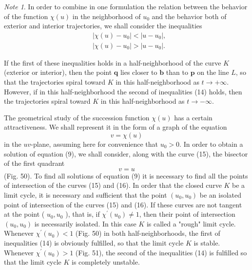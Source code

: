 \documentclass[10pt,a5paper]{book}
\theoremstyle{plain}
\theoremstyle{definition}
\theoremstyle{remark}
\newtheorem*{note}{Note}
\begin{document}
\begin{note}
In order to combine in one formulation the relation between the behavior of the function $\chi(u)$ in the neighborhood of $u_{0}$ and the behavior both of exterior and interior trajectories, we shall consider the inequalities
\begin{align*}
& \left|\chi(u)-u_{0}\right|<\left|u-u_{0}\right|,  \tag{14}\\
& \left|\chi(u)-u_{0}\right|>\left|u-u_{0}\right| .
\end{align*}
\end{note}

If the first of these inequalities holds in a half-neighborhood of the curve $K$ (exterior or interior), then the point $\mathbf{q}$ lies closer to $\mathbf{b}$ than to $\mathbf{p}$ on the line $L$, so that the trajectories spiral toward $K$ in this half-neighborhood as $t \rightarrow+\infty$. However, if in this half-neighborhood the second of inequalities (14) holds, then the trajectories spiral toward $K$ in this half-neighborhood as $t \rightarrow-\infty$.

The geometrical study of the succession function $\chi(u)$ has a certain attractiveness. We shall represent it in the form of a graph of the equation
\begin{equation*}
v=\chi(u) \tag{15}
\end{equation*}
in the $u v$-plane, assuming here for convenience that $u_{0}>0$. In order to obtain a solution of equation (9), we shall consider, along with the curve (15), the bisector of the first quadrant
\begin{equation*}
v=u \tag{16}
\end{equation*}
(Fig. 50). To find all solutions of equation (9) it is necessary to find all the points of intersection of the curves (15) and (16). In order that the closed curve $K$ be a limit cycle, it is necessary and sufficient that the point $\left(u_{0}, u_{0}\right)$ be an isolated point of intersection of the curves (15) and (16). If these curves are not tangent at the point ( $u_{0}, u_{0}$ ), that is, if $\chi^{\prime}\left(u_{0}\right) \neq 1$, then their point of intersection $\left(u_{0}, u_{0}\right)$ is necessarily isolated. In this case $K$ is called a "rough" limit cycle. Whenever $\chi^{\prime}\left(u_{0}\right)<1$ (Fig. 50) in both half-neighborhoods, the first of inequalities (14) is obviously fulfilled, so that the limit cycle $K$ is stable. Whenever $\chi^{\prime}\left(u_{0}\right)>1$ (Fig. 51), the second of the inequalities (14) is fulfilled so that the limit cycle $K$ is completely unstable.
\end{document}
